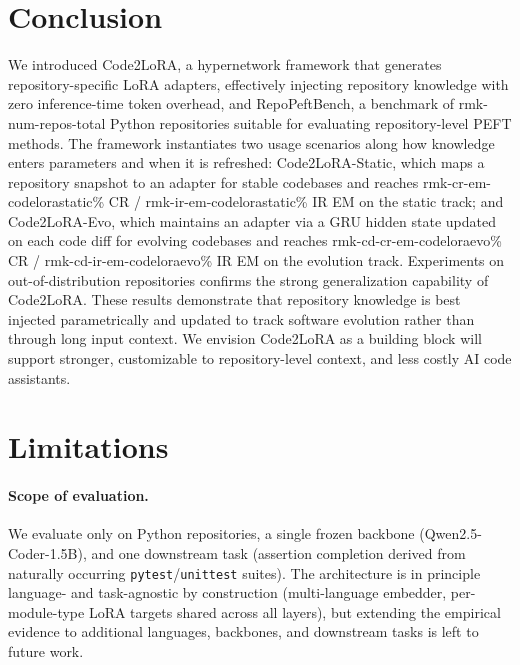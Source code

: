 \documentclass[11pt]{article}
\newcommand{\UseMacro}[1]{\csname rmk-#1\endcsname}
\newcommand{\codelora}{Code2LoRA\xspace}
\newcommand{\repopeftbench}{RepoPeftBench\xspace}
\newcommand{\codelorastatic}{\codelora-Static\xspace}
\newcommand{\codeloraevo}{\codelora-Evo\xspace}
\begin{document}
\section{Conclusion}
\label{sec:conclusion}

We introduced \codelora{}, a hypernetwork framework that generates repository-specific LoRA adapters, effectively injecting repository knowledge with zero inference-time token overhead,
and \repopeftbench{}, a benchmark of \UseMacro{num-repos-total} Python repositories suitable for evaluating repository-level PEFT methods.
The framework instantiates two usage scenarios along how knowledge enters parameters and when it is refreshed: \codelorastatic{}, which maps a repository snapshot to an adapter for stable codebases and reaches \UseMacro{cr-em-codelorastatic}\% CR / \UseMacro{ir-em-codelorastatic}\% IR EM on the static track;
and \codeloraevo{}, which maintains an adapter via a GRU hidden state updated on each code diff for evolving codebases and reaches \UseMacro{cd-cr-em-codeloraevo}\% CR / \UseMacro{cd-ir-em-codeloraevo}\% IR EM on the evolution track.
Experiments on out-of-distribution repositories confirms the strong generalization capability of \codelora{}.
These results demonstrate that repository knowledge is best injected parametrically and updated to track software evolution rather than through long input context.
We envision \codelora{} as a building block will support stronger, customizable to repository-level context, and less costly AI code assistants.





\section*{Limitations}

\paragraph{Scope of evaluation.}
We evaluate only on Python repositories, a single frozen backbone (Qwen2.5-Coder-1.5B), and one downstream task (assertion completion derived from naturally occurring \texttt{pytest}/\texttt{unittest} suites).
The architecture is in principle language- and task-agnostic by construction (multi-language embedder, per-module-type LoRA targets shared across all layers), but extending the empirical evidence to additional languages, backbones, and downstream tasks is left to future work.
\end{document}
